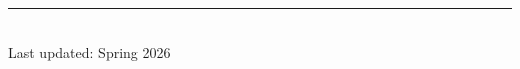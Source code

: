 \documentclass[11pt]{article} %
\begin{document}
% 


% 


% 


\centering
\rule{0.25\linewidth}{0.4pt}\\
\medskip
Last updated: Spring 2026
\end{document}
